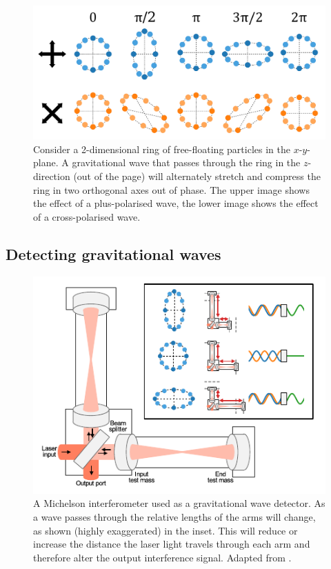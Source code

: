 \begin{colsection}
\begin{colsection}
\begin{figure}[p]
    \begin{center}
        \includegraphics[width=0.8\linewidth]{images/waveimg2.pdf}
    \end{center}
    \caption[Gravitational wave polarisations]{
        Consider a 2-dimensional ring of free-floating particles in the $x$-$y$-plane. A gravitational wave that passes through the ring in the $z$-direction (out of the page) will alternately stretch and compress the ring in two orthogonal axes out of phase. The upper image shows the effect of a plus-polarised wave, the lower image shows the effect of a cross-polarised wave.
        }\label{fig:wave}
\end{figure}

\end{colsection}


\subsection{Detecting gravitational waves}
\label{sec:gw_detecting}
\begin{colsection}

\begin{figure}[p]
    \begin{center}
        \includegraphics[width=0.75\linewidth]{images/detector.pdf}
    \end{center}
    \caption[A Michelson interferometer used as a gravitational wave detector]{
        A Michelson interferometer used as a gravitational wave detector. As a wave passes through the relative lengths of the arms will change, as shown (highly exaggerated) in the inset. This will reduce or increase the distance the laser light travels through each arm and therefore alter the output interference signal. Adapted from \citet{GW150914_detectors}.
        }\label{fig:detector}
\end{figure}


\end{colsection}
\end{colsection}
